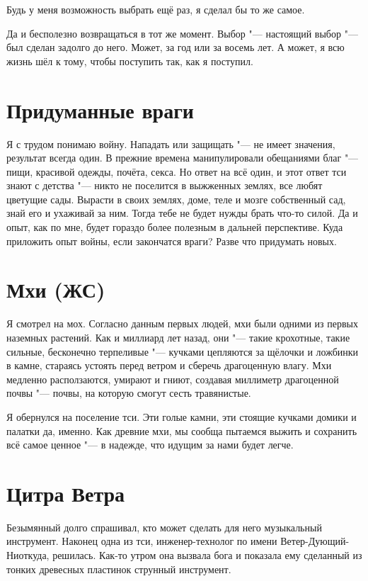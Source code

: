 \documentclass[a4paper,10pt]{book}
\newcommand{\ldotst}{\so{...}\xspace}
\begin{document}
 Будь у меня возможность выбрать ещё раз, я сделал бы то же самое.

Да и бесполезно возвращаться в тот же момент. Выбор "--- настоящий выбор "--- был сделан задолго до него. Может, за год или за восемь лет. А может, я всю жизнь шёл к тому, чтобы поступить так, как я поступил.
 
 \section{Придуманные враги}

 Я с трудом понимаю войну. Нападать или защищать "--- не имеет значения, 
результат всегда один. В прежние времена манипулировали обещаниями благ "--- 
пищи, красивой одежды, почёта, секса. Но ответ на всё один, и этот ответ тси 
знают с детства "--- никто не поселится в выжженных землях, все любят цветущие 
сады. Вырасти в своих землях, доме, теле и мозге собственный сад, знай его и 
ухаживай за ним. Тогда тебе не будет нужды брать что-то силой. Да и опыт, как 
по 
мне, будет гораздо более полезным в дальней перспективе. Куда приложить опыт 
войны, если закончатся враги? Разве что придумать новых.


 
 \section{Мхи (ЖС)}

Я смотрел на мох. Согласно данным первых людей, мхи были одними из первых 
наземных растений. Как и миллиард лет назад, они "--- такие крохотные, такие 
сильные, бесконечно терпеливые "--- кучками цепляются за щёлочки и ложбинки в 
камне, стараясь устоять перед ветром и сберечь драгоценную влагу. Мхи медленно 
расползаются, умирают и гниют, создавая миллиметр драгоценной почвы "--- почвы, 
на которую смогут сесть травянистые.

Я обернулся на поселение тси. Эти голые камни, эти стоящие кучками домики и 
палатки\ldotst да, именно. Как древние мхи, мы сообща пытаемся выжить и 
сохранить всё самое ценное "--- в надежде, что идущим за нами будет легче.
 
 \section{Цитра Ветра}

 Безымянный долго спрашивал, кто может сделать для него музыкальный инструмент. 
Наконец одна из тси, инженер-технолог по имени Ветер-Дующий-Ниоткуда, решилась.
Как-то утром она вызвала бога и показала ему сделанный из тонких древесных 
пластинок струнный инструмент.
\end{document}
